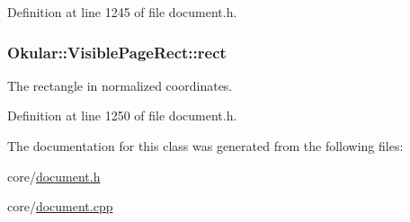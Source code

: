 Definition at line 1245 of file document.\+h.

\hypertarget{classOkular_1_1VisiblePageRect_a66142566f9a0db1119d95bf84ff537ba}{
\subsubsection[{rect}]{ Okular\+::\+Visible\+Page\+Rect\+::rect}}\label{classOkular_1_1VisiblePageRect_a66142566f9a0db1119d95bf84ff537ba}
The rectangle in normalized coordinates. 

Definition at line 1250 of file document.\+h.



The documentation for this class was generated from the following files\+:\begin{DoxyCompactItemize}
\item 
core/\hyperlink{core_2document_8h}{document.\+h}\item 
core/\hyperlink{core_2document_8cpp}{document.\+cpp}\end{DoxyCompactItemize}
